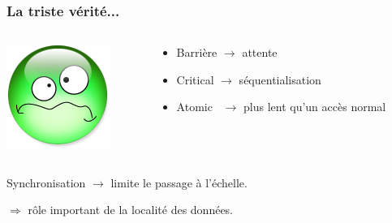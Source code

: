 \documentclass[xcolor={x11names,svgnames},x11names,svgnames]{beamer}
\begin{document}
\begin{frame}
  \frametitle{La triste vérité...}

    \begin{columns}[c]
    \begin{column}{.1\textwidth}
      \includegraphics[width=\textwidth]{triste.png}
    \end{column}
    \begin{column}{.9\textwidth}

      
  \begin{itemize}
  \item Barrière $\rightarrow$ attente
  \item Critical $\rightarrow$ séquentialisation
  \item Atomic~  $\rightarrow$ plus lent qu'un accès normal
  \end{itemize}

\end{column}
\end{columns}

\bigskip
  
  Synchronisation $\rightarrow$ limite le passage à l'échelle.

  \bigskip

  $\Longrightarrow$ rôle important de la localité des données.
\end{frame}
\end{document}
